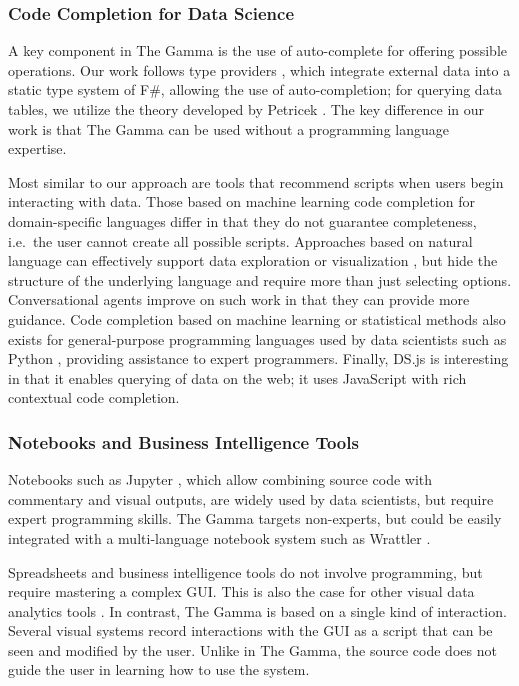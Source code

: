 \documentclass[manuscript,review,anonymous]{acmart}
\begin{document}
\subsubsection*{Code Completion for Data Science}

A key component in The Gamma is the use of auto-complete for offering possible operations.
Our work follows type providers \cite{inforich,fsdata}, which integrate external data into a
static type system of F\#, allowing the use of auto-completion; for querying data tables, we utilize
the theory developed by Petricek \cite{dotdriven}. The key difference in our work is that The Gamma
can be used without a programming language expertise.

Most similar to our approach are tools that recommend scripts when users begin interacting
with data. Those based on machine learning code completion for domain-specific languages \cite{predictive,proactive}
differ in that they do not guarantee completeness, i.e.~the user cannot create all possible
scripts. Approaches based on natural language can effectively support data exploration
or visualization \cite{eviza,codemend}, but hide the structure of the underlying language and
require more than just selecting options. Conversational agents \cite{iris} improve on such work
in that they can provide more guidance. Code completion based on machine learning or statistical
methods \cite{mlcomplete,statcomplete} also exists for general-purpose programming languages used
by data scientists such as Python \cite{pythia}, providing assistance to expert programmers.
Finally, DS.js \cite{dsjs} is interesting in that it enables querying of data on the
web; it uses JavaScript with rich contextual code completion.

\subsubsection*{Notebooks and Business Intelligence Tools}

Notebooks such as Jupyter \cite{jupyter}, which allow combining source code with commentary and
visual outputs, are widely used by data scientists, but require expert programming skills.
The Gamma targets non-experts, but could be easily integrated with a multi-language notebook system
such as Wrattler \cite{wrattler}.

Spreadsheets and business intelligence tools \cite{tableau,powerbi} do
not involve programming, but require mastering a complex GUI. This is also the case
for other visual data analytics tools \cite{control,vizdom}. In contrast, The Gamma is
based on a single kind of interaction. Several visual systems \cite{potter,wrangler,lyra} record
interactions with the GUI as a script that can be seen and modified by the user.
Unlike in The Gamma, the source code does not guide the user in learning how to use the system.
\end{document}

